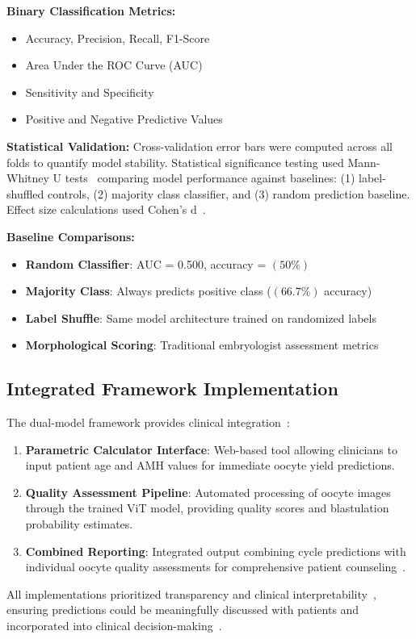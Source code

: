 \textbf{Binary Classification Metrics:}
\begin{itemize}
\item Accuracy, Precision, Recall, F1-Score
\item Area Under the ROC Curve (AUC)
\item Sensitivity and Specificity
\item Positive and Negative Predictive Values
\end{itemize}

\textbf{Statistical Validation:}
Cross-validation error bars were computed across all folds to quantify model stability. Statistical significance testing used Mann-Whitney U tests~\cite{mann1947test} comparing model performance against baselines: (1) label-shuffled controls, (2) majority class classifier, and (3) random prediction baseline. Effect size calculations used Cohen's d~\cite{cohen1988statistical}. 

\textbf{Baseline Comparisons:}
\begin{itemize}
\item \textbf{Random Classifier}: AUC = 0.500, accuracy = $(50\%)$
\item \textbf{Majority Class}: Always predicts positive class ($(66.7\%)$ accuracy)
\item \textbf{Label Shuffle}: Same model architecture trained on randomized labels
\item \textbf{Morphological Scoring}: Traditional embryologist assessment metrics
\end{itemize}

\subsection{Integrated Framework Implementation}

The dual-model framework provides clinical integration~\cite{fda2022clinical}:

\begin{enumerate}
\item \textbf{Parametric Calculator Interface}: Web-based tool allowing clinicians to input patient age and AMH values for immediate oocyte yield predictions.

\item \textbf{Quality Assessment Pipeline}: Automated processing of oocyte images through the trained ViT model, providing quality scores and blastulation probability estimates.

\item \textbf{Combined Reporting}: Integrated output combining cycle predictions with individual oocyte quality assessments for comprehensive patient counseling~\cite{asrm2021counselors}.
\end{enumerate}

All implementations prioritized transparency and clinical interpretability~\cite{topol2019high}, ensuring predictions could be meaningfully discussed with patients and incorporated into clinical decision-making~\cite{beauchamp2019principles}. 